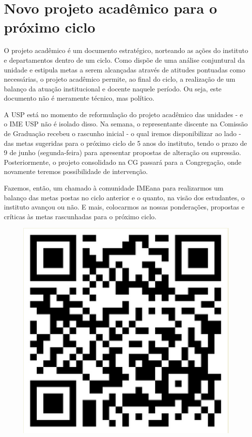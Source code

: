 \section*{Novo projeto acadêmico para o próximo ciclo}

O projeto acadêmico é um documento estratégico, norteando as ações do instituto e departamentos dentro de um ciclo. Como dispõe de uma análise conjuntural da unidade e estipula metas a serem alcançadas através de atitudes pontuadas como necessárias, o projeto acadêmico permite, ao final do ciclo, a realização de um balanço da atuação institucional e docente naquele período. Ou seja, este documento não é meramente técnico, mas político.

A USP está no momento de reformulação do projeto acadêmico das unidades - e o IME USP não é isolado disso. Na semana, o representante discente na Comissão de Graduação recebeu o rascunho inicial - o qual iremos disponibilizar ao lado - das metas sugeridas para o próximo ciclo de 5 anos do instituto, tendo o prazo de 9 de junho (segunda-feira) para apresentar propostas de alteração ou supressão. Posteriormente, o projeto consolidado na CG passará para a Congregação, onde novamente teremos possibilidade de intervenção.

Fazemos, então, um chamado à comunidade IMEana para realizarmos um balanço das metas postas no ciclo anterior e o quanto, na visão dos estudantes, o instituto avançou ou não. E mais, colocarmos as nossas ponderações, propostas e críticas às metas rascunhadas para o próximo ciclo. 


\vfill\null\columnbreak

\begin{figure}[H]
    \centering
    \includegraphics[width=0.5\linewidth]{textos//img/qrcode_colaboracao.png}
\end{figure}

